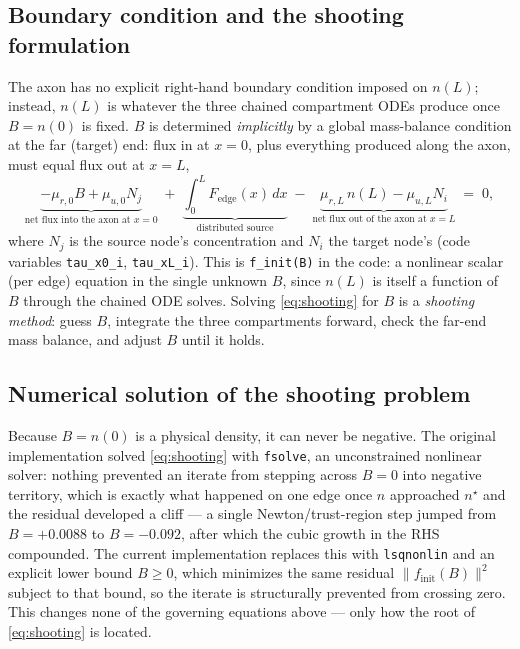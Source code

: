 ﻿\documentclass[11pt]{article}
\begin{document}
\subsection{Boundary condition and the shooting formulation}

The axon has no explicit right-hand boundary condition imposed on $n(L)$;
instead, $n(L)$ is whatever the three chained compartment ODEs produce once
$B=n(0)$ is fixed. $B$ is determined \emph{implicitly} by a global mass-balance
condition at the far (target) end: flux in at $x=0$, plus everything produced
along the axon, must equal flux out at $x=L$,
\[
  \underbrace{-\mu_{r,0} B + \mu_{u,0} N_j}_{\text{net flux into the axon at }x=0}
  \;+\; \underbrace{\int_0^L F_{\mathrm{edge}}(x)\,dx}_{\text{distributed source}}
  \;-\; \underbrace{\mu_{r,L}\, n(L) - \mu_{u,L} N_i}_{\text{net flux out of the axon at }x=L}
  \;=\; 0 ,
  \tag{$\star$}
  \label{eq:shooting}
\]
where $N_j$ is the source node's concentration and $N_i$ the target node's
(code variables \texttt{tau\_x0\_i}, \texttt{tau\_xL\_i}). This is
\texttt{f\_init(B)} in the code: a nonlinear scalar (per edge) equation in the
single unknown $B$, since $n(L)$ is itself a function of $B$ through the
chained ODE solves. Solving \eqref{eq:shooting} for $B$ is a \emph{shooting
method}: guess $B$, integrate the three compartments forward, check the
far-end mass balance, and adjust $B$ until it holds.

\subsection{Numerical solution of the shooting problem}
\label{sec:shooting-numerics}

Because $B=n(0)$ is a physical density, it can never be negative. The
original implementation solved \eqref{eq:shooting} with \texttt{fsolve}, an
unconstrained nonlinear solver: nothing prevented an iterate from stepping
across $B=0$ into negative territory, which is exactly what happened on one
edge once $n$ approached $n^\star$ and the residual developed a cliff --- a
single Newton/trust-region step jumped from $B=+0.0088$ to $B=-0.092$,
after which the cubic growth in the RHS compounded. The current
implementation replaces this with \texttt{lsqnonlin} and an explicit lower
bound $B\ge 0$, which minimizes the same residual $\|f_{\mathrm{init}}(B)\|^2$
subject to that bound, so the iterate is structurally prevented from crossing
zero. This changes none of the governing equations above --- only how the
root of \eqref{eq:shooting} is located.
\end{document}
